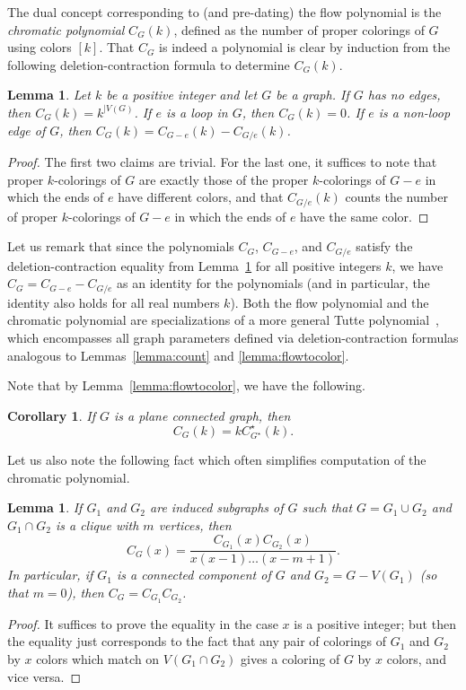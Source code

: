 \documentclass[12pt,twoside,openright,a4paper]{book}
\newtheorem{lemma}[theorem]{Lemma}
\newtheorem{corollary}[theorem]{Corollary}
\begin{document}
The dual concept corresponding to (and pre-dating) the flow polynomial is the \emph{chromatic polynomial} $C_G(k)$,
defined as the number of proper colorings of $G$ using colors $[k]$.  That $C_G$ is indeed a polynomial is clear by
induction from the following deletion-contraction formula to determine $C_G(k)$.
\begin{lemma}\label{lemma:delcon}
Let $k$ be a positive integer and let $G$ be a graph.  If $G$ has no edges, then $C_G(k)=k^{|V(G)}$.
If $e$ is a loop in $G$, then $C_G(k)=0$.  If $e$ is a non-loop edge of $G$, then
$C_G(k)=C_{G-e}(k)-C_{G/e}(k)$.
\end{lemma}
\begin{proof}
The first two claims are trivial.  For the last one, it suffices to note that proper $k$-colorings of $G$
are exactly those of the proper $k$-colorings of $G-e$ in which the ends of $e$ have different colors,
and that $C_{G/e}(k)$ counts the number of proper $k$-colorings of $G-e$ in which the ends of $e$ have the same color.
\end{proof}
Let us remark that since the polynomials $C_G$, $C_{G-e}$, and $C_{G/e}$ satisfy the deletion-contraction
equality from Lemma~\ref{lemma:delcon} for all positive integers $k$, we have $C_G=C_{G-e}-C_{G/e}$ as an identity for
the polynomials (and in particular, the identity also holds for all real numbers $k$).
Both the flow polynomial and the chromatic polynomial are specializations of
a more general Tutte polynomial~\cite{tutteflow}, which encompasses all graph parameters defined via deletion-contraction formulas
analogous to Lemmas~\ref{lemma:count} and \ref{lemma:flowtocolor}.

Note that by Lemma~\ref{lemma:flowtocolor}, we have the following.
\begin{corollary}
If $G$ is a plane connected graph, then
$$C_G(k)=kC^\star_{G^\star}(k).$$
\end{corollary}

Let us also note the following fact which often simplifies computation of the chromatic polynomial.
\begin{lemma}\label{lemma:chrmult}
If $G_1$ and $G_2$ are induced subgraphs of $G$ such that $G=G_1\cup G_2$
and $G_1\cap G_2$ is a clique with $m$ vertices, then
$$C_G(x)=\frac{C_{G_1}(x)C_{G_2}(x)}{x(x-1)\ldots (x-m+1)}.$$
In particular, if $G_1$ is a connected component of $G$ and $G_2=G-V(G_1)$ (so that $m=0$), then $C_G=C_{G_1}C_{G_2}$.
\end{lemma}
\begin{proof}
It suffices to prove the equality in the case $x$ is a positive integer; but then the equality just corresponds
to the fact that any pair of colorings of $G_1$ and $G_2$ by $x$ colors which match on $V(G_1\cap G_2)$ gives a coloring of $G$ by $x$ colors,
and vice versa.
\end{proof}
\end{document}
